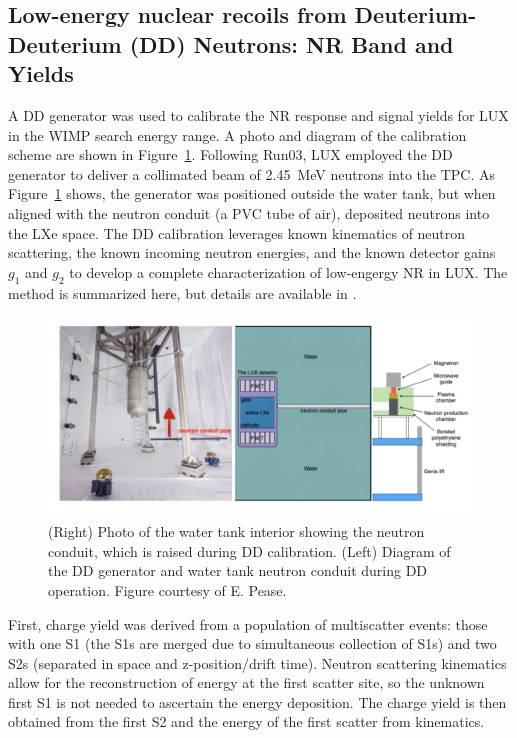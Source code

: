 \subsection{Low-energy nuclear recoils from Deuterium-Deuterium (DD) Neutrons: NR Band and Yields}
\label{sec:DD}
A \ac{DD} generator was used to calibrate the \ac{NR} response and signal yields for \ac{LUX} in the \ac{WIMP} search energy range. A photo and diagram of the calibration scheme are shown in Figure~\ref{fig:dd_gen}. Following Run03, \ac{LUX} employed the \ac{DD} generator to deliver a collimated beam of 2.45~MeV neutrons into the \ac{TPC}. As Figure~\ref{fig:dd_gen} shows, the generator was positioned outside the water tank, but when aligned with the neutron conduit (a \ac{PVC} tube of air), deposited neutrons into the \ac{LXe} space. The \ac{DD} calibration leverages known kinematics of neutron scattering, the known incoming neutron energies, and the known detector gains $g_{1}$ and $g_{2}$ to develop a complete characterization of low-engergy \ac{NR} in \ac{LUX}. The method is summarized here, but details are available in \cite{LUXDD}.

\begin{figure}[htbp]
\begin{center}
\includegraphics[width=\textwidth]{figures/lux/lux_ddgenerator.png}
\caption{(Right) Photo of the water tank interior showing the neutron conduit, which is raised during \ac{DD} calibration. (Left) Diagram of the \ac{DD} generator and water tank neutron conduit during \ac{DD} operation. Figure courtesy of E. Pease.}
\label{fig:dd_gen}
\end{center}
\end{figure}

First, charge yield was derived from a population of multiscatter events: those with one S1 (the S1s are merged due to simultaneous collection of S1s) and two S2s (separated in space and z-position/drift time). Neutron scattering kinematics allow for the reconstruction of energy at the first scatter site, so the unknown first S1 is not needed to ascertain the energy deposition. The charge yield is then obtained from the first S2 and the energy of the first scatter from kinematics. 

